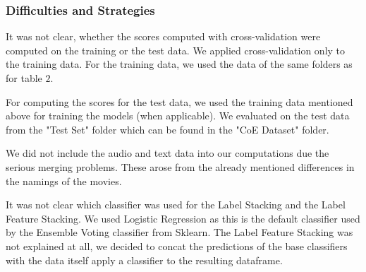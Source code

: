 \subsubsection*{Difficulties and Strategies}
It was not clear, whether the scores computed with cross-validation were computed on the training or the test data. We applied cross-validation only to the training data. For the training data, we used the data of the same folders as for table $2$. 

For computing the scores for the test data, we used the training data mentioned above for training the models (when applicable). We evaluated on the test data from the "Test Set" folder which can be found in the "CoE Dataset" folder. 

We did not include the audio and text data into our computations due the serious merging problems. These arose from the already mentioned differences in the namings of the movies. 

It was not clear which classifier was used for the Label Stacking and the Label Feature Stacking. We used Logistic Regression as this is the default classifier used by the Ensemble Voting classifier from Sklearn. 
The Label Feature Stacking was not explained at all, we decided to concat the predictions of the base classifiers with the data itself apply a classifier to the resulting dataframe. 
